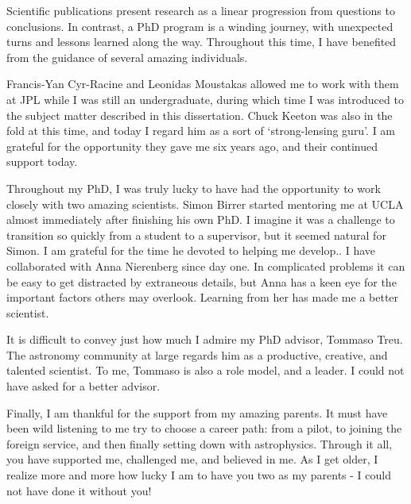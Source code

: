 {\indent Scientific publications present research as a linear progression from questions to conclusions. In contrast, a PhD program is a winding journey, with unexpected turns and lessons learned along the way. Throughout this time, I have benefited from the guidance of several amazing individuals. 
	
Francis-Yan Cyr-Racine and Leonidas Moustakas allowed me to work with them at JPL while I was still an undergraduate, during which time I was introduced to the subject matter described in this dissertation. Chuck Keeton was also in the fold at this time, and today I regard him as a sort of `strong-lensing guru'. I am grateful for the opportunity they gave me six years ago, and their continued support today. 

Throughout my PhD, I was truly lucky to have had the opportunity to work closely with two amazing scientists. Simon Birrer started mentoring me at UCLA almost immediately after finishing his own PhD. I imagine it was a challenge to transition so quickly from a student to a supervisor, but it seemed natural for Simon. I am grateful for the time he devoted to helping me develop.. I have collaborated with Anna Nierenberg since day one. In complicated problems it can be easy to get distracted by extraneous details, but Anna has a keen eye for the important factors others may overlook. Learning from her has made me a better scientist. 

It is difficult to convey just how much I admire my PhD advisor, Tommaso Treu. The astronomy community at large regards him as a productive, creative, and talented scientist. To me, Tommaso is also a role model, and a leader. I could not have asked for a better advisor.  

Finally, I am thankful for the support from my amazing parents. It must have been wild listening to me try to choose a career path: from a pilot, to joining the foreign service, and then finally setting down with astrophysics. Through it all, you have supported me, challenged me, and believed in me. As I get older, I realize more and more how lucky I am to have you two as my parents - I could not have done it without you! 
}